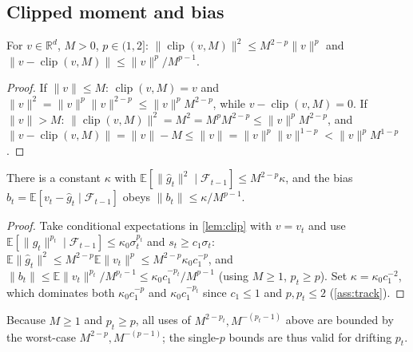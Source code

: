 \documentclass{article}
\newcommand{\E}{\mathbb{E}}
\newcommand{\R}{\mathbb{R}}
\newcommand{\norm}[1]{\lVert #1 \rVert}
\newcommand{\gt}{g_t}
\newcommand{\clip}{\operatorname{clip}}
\begin{document}
\subsection{Clipped moment and bias}
\begin{lemma}
\label{lem:clip}
For $v\in\R^d$, $M>0$, $p\in(1,2]$: $\norm{\clip(v,M)}^2\le M^{2-p}\norm v^p$ and
$\norm{v-\clip(v,M)}\le\norm v^p/M^{p-1}$.
\end{lemma}
\begin{proof}
If $\norm v\le M$: $\clip(v,M)=v$ and $\norm v^2=\norm v^p\norm v^{2-p}\le\norm v^p
M^{2-p}$, while $v-\clip(v,M)=0$. If $\norm v>M$: $\norm{\clip(v,M)}^2=M^2=M^pM^{2-p}
\le\norm v^pM^{2-p}$, and $\norm{v-\clip(v,M)}=\norm v-M\le\norm v=\norm v^p\norm
v^{1-p}<\norm v^pM^{1-p}$.
\end{proof}
\begin{lemma}
\label{lem:moment}
There is a constant $\kappa$ with $\E[\norm{\hat g_t}^2\mid\mathcal F_{t-1}]\le
M^{2-p}\kappa$, and the bias $b_t=\E[v_t-\hat g_t\mid\mathcal F_{t-1}]$ obeys
$\norm{b_t}\le\kappa/M^{p-1}$.
\end{lemma}
\begin{proof}
Take conditional expectations in \cref{lem:clip} with $v=v_t$ and use
$\E[\norm{\gt}^{p_t}\mid\mathcal F_{t-1}]\le\kappa_0\sigma_t^{p_t}$ and
$s_t\ge c_1\sigma_t$: $\E\norm{\hat g_t}^2\le M^{2-p}\E\norm{v_t}^p\le M^{2-p}
\kappa_0 c_1^{-p}$, and $\norm{b_t}\le\E\norm{v_t}^{p_t}/M^{p_t-1}\le\kappa_0 c_1^{-p_t}
/M^{p-1}$ (using $M\ge1$, $p_t\ge p$). Set $\kappa=\kappa_0 c_1^{-2}$, which dominates both
$\kappa_0 c_1^{-p}$ and $\kappa_0 c_1^{-p_t}$ since $c_1\le1$ and $p,p_t\le2$
(\cref{ass:track}).
\end{proof}
Because $M\ge1$ and $p_t\ge p$, all uses of $M^{2-p_t},M^{-(p_t-1)}$ above are bounded
by the worst-case $M^{2-p},M^{-(p-1)}$; the single-$p$ bounds are thus valid for
drifting $p_t$.
\end{document}
